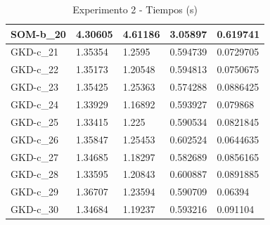 \documentclass[11pt,a4paper]{article}
\begin{document}
\begin{table}[H]
\begin{tabular}{l|l|l|l|l|}
			\multicolumn{1}{|l|}{SOM-b\_20} & 4.30605  & 4.61186  & 3.05897  & 0.619741  \\ \hline
			\multicolumn{1}{|l|}{GKD-c\_21} & 1.35354  & 1.2595   & 0.594739 & 0.0729705 \\ \hline
			\multicolumn{1}{|l|}{GKD-c\_22} & 1.35173  & 1.20548  & 0.594813 & 0.0750675 \\ \hline
			\multicolumn{1}{|l|}{GKD-c\_23} & 1.35425  & 1.25363  & 0.574288 & 0.0886425 \\ \hline
			\multicolumn{1}{|l|}{GKD-c\_24} & 1.33929  & 1.16892  & 0.593927 & 0.079868  \\ \hline
			\multicolumn{1}{|l|}{GKD-c\_25} & 1.33415  & 1.225    & 0.590534 & 0.0821845 \\ \hline
			\multicolumn{1}{|l|}{GKD-c\_26} & 1.35847  & 1.25453  & 0.602524 & 0.0644635 \\ \hline
			\multicolumn{1}{|l|}{GKD-c\_27} & 1.34685  & 1.18297  & 0.582689 & 0.0856165 \\ \hline
			\multicolumn{1}{|l|}{GKD-c\_28} & 1.33595  & 1.20843  & 0.600887 & 0.0891885 \\ \hline
			\multicolumn{1}{|l|}{GKD-c\_29} & 1.36707  & 1.23594  & 0.590709 & 0.06394   \\ \hline
			\multicolumn{1}{|l|}{GKD-c\_30} & 1.34684  & 1.19237  & 0.593216 & 0.091104  \\ \hline
		\end{tabular}
		\caption{ Experimento 2 - Tiempos (s) }
		\label{222}
	\end{table}	
	
\end{document}
